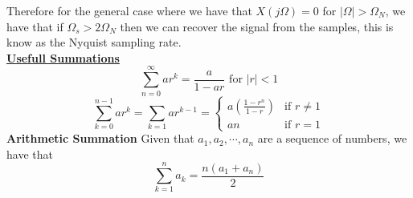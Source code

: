 \documentclass[9pt]{article}
\begin{document}
Therefore for the general case where we have that 
$X(j\Omega)=0$ for $|\Omega|>\Omega_N$, we have that
if $\Omega_s>2\Omega_N$ then we 
can recover the signal from the samples, this is know as the Nyquist sampling rate. \\
\underline{\textbf{Usefull Summations}}\\
$$\sum_{n=0}^{\infty}ar^k=\frac{a}{1-ar} \text{ for }|r|<1$$
$$\sum_{k=0}^{n-1}ar^{k}=\sum_{k=1}ar^{k-1}=\begin{cases}
    a\left(\frac{1-r^n}{1-r}\right) & \text{if }r\neq 1\\
    an & \text{if }r=1
\end{cases}$$
\textbf{Arithmetic Summation}
Given that $a_1,a_2,\cdots,a_n$ are a sequence of numbers, we have that
$$\sum_{k=1}^n a_k=\frac{n(a_1+a_n)}{2}$$
\end{document}

